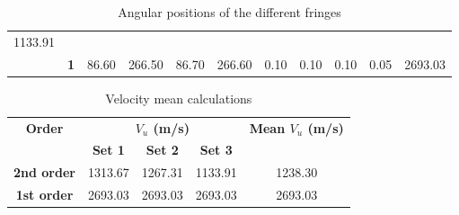 \begin{table}[]
\begin{tabular}{|cc|cc|cc|c|c|c|c|c|}
		1133.91                                                 \\ \cline{2-11}
		\multicolumn{1}{|c|}{}                                &
		\textbf{1}                                            &
		\multicolumn{1}{c|}{86.60}                            &
		266.50                                                &
		\multicolumn{1}{c|}{86.70}                            &
		266.60                                                &
		0.10                                                  &
		0.10                                                  &
		0.10                                                  &
		0.05                                                  &
		2693.03                                                 \\ \hline
	\end{tabular}
	\caption{Angular positions of the different fringes}
	\label{table:1}
\end{table}


\begin{table}[]
	\centering
	\begin{tabular}{|c|ccc|c|}
		\hline
		\multirow{2}{*}{\textbf{Order}} & \multicolumn{3}{c|}{\textbf{$V_u$ (m/s)}} & \multirow{2}{*}{\textbf{Mean $V_u$ (m/s)}}                            \\ \cline{2-4}
		                                & \multicolumn{1}{c|}{\textbf{Set 1}}       & \multicolumn{1}{c|}{\textbf{Set 2}}        & \textbf{Set 3} &         \\ \hline
		\textbf{2nd order}       & \multicolumn{1}{c|}{1313.67}              & \multicolumn{1}{c|}{1267.31}               & 1133.91        & 1238.30 \\ \hline
		\textbf{1st order}       & \multicolumn{1}{c|}{2693.03}              & \multicolumn{1}{c|}{2693.03}               & 2693.03        & 2693.03 \\ \hline
	\end{tabular}
	\caption{Velocity mean calculations}
	\label{table:2}
\end{table}